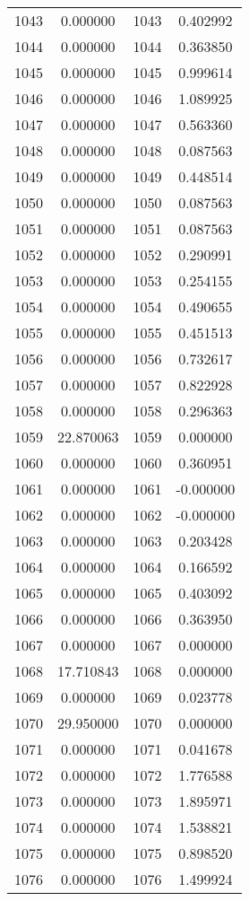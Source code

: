 \documentclass[12pt]{article}
\begin{document}
\begin{longtable}{@{}cccc@{}}
1043 & 0.000000 & 1043 & 0.402992 \\
1044 & 0.000000 & 1044 & 0.363850 \\
1045 & 0.000000 & 1045 & 0.999614 \\
1046 & 0.000000 & 1046 & 1.089925 \\
1047 & 0.000000 & 1047 & 0.563360 \\
1048 & 0.000000 & 1048 & 0.087563 \\
1049 & 0.000000 & 1049 & 0.448514 \\
1050 & 0.000000 & 1050 & 0.087563 \\
1051 & 0.000000 & 1051 & 0.087563 \\
1052 & 0.000000 & 1052 & 0.290991 \\
1053 & 0.000000 & 1053 & 0.254155 \\
1054 & 0.000000 & 1054 & 0.490655 \\
1055 & 0.000000 & 1055 & 0.451513 \\
1056 & 0.000000 & 1056 & 0.732617 \\
1057 & 0.000000 & 1057 & 0.822928 \\
1058 & 0.000000 & 1058 & 0.296363 \\
1059 & 22.870063 & 1059 & 0.000000 \\
1060 & 0.000000 & 1060 & 0.360951 \\
1061 & 0.000000 & 1061 & -0.000000 \\
1062 & 0.000000 & 1062 & -0.000000 \\
1063 & 0.000000 & 1063 & 0.203428 \\
1064 & 0.000000 & 1064 & 0.166592 \\
1065 & 0.000000 & 1065 & 0.403092 \\
1066 & 0.000000 & 1066 & 0.363950 \\
1067 & 0.000000 & 1067 & 0.000000 \\
1068 & 17.710843 & 1068 & 0.000000 \\
1069 & 0.000000 & 1069 & 0.023778 \\
1070 & 29.950000 & 1070 & 0.000000 \\
1071 & 0.000000 & 1071 & 0.041678 \\
1072 & 0.000000 & 1072 & 1.776588 \\
1073 & 0.000000 & 1073 & 1.895971 \\
1074 & 0.000000 & 1074 & 1.538821 \\
1075 & 0.000000 & 1075 & 0.898520 \\
1076 & 0.000000 & 1076 & 1.499924 \\

\end{longtable}
\end{document}
